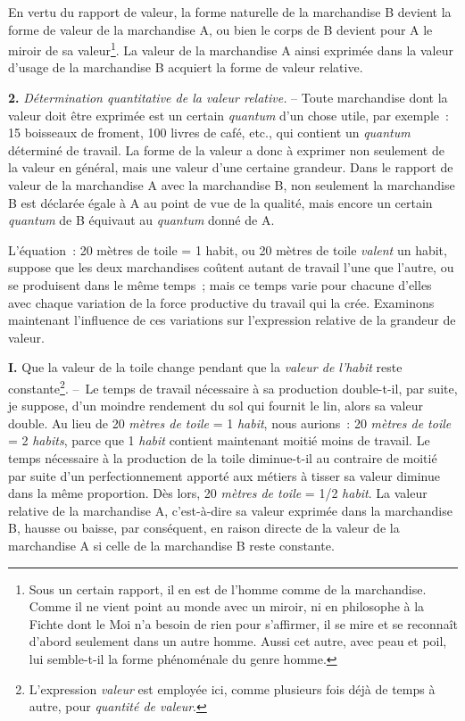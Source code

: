 \documentclass[french,twoside]{book} %
\begin{document}
En vertu du rapport de valeur, la forme naturelle de la marchandise B devient la forme de valeur de la marchandise A, ou bien le corps de B devient pour A le miroir de sa valeur\footnote{Sous un certain rapport, il en est de l’homme comme de la marchandise. Comme il ne vient point au monde avec un miroir, ni en philosophe à la Fichte dont le Moi n’a besoin de rien pour s’affirmer, il se mire et se reconnaît d’abord seulement dans un autre homme. Aussi cet autre, avec peau et poil, lui semble-t-il la forme phénoménale du genre homme.}. La valeur de la marchandise A ainsi exprimée dans la valeur d’usage de la marchandise B acquiert la forme de valeur relative.\par
\textbf{2.} \emph{Détermination quantitative de la valeur relative.} – Toute marchandise dont la valeur doit être exprimée est un certain \emph{quantum} d’un chose utile, par exemple : 15 boisseaux de froment, 100 livres de café, etc., qui contient un \emph{quantum} déterminé de travail. La forme de la valeur a donc à exprimer non seulement de la valeur en général, mais une valeur d’une certaine grandeur. Dans le rapport de valeur de la marchandise A avec la marchandise B, non seulement la marchandise B est déclarée égale à A au point de vue de la qualité, mais encore un certain \emph{quantum} de B équivaut au \emph{quantum} donné de A.\par
L’équation : 20 mètres de toile = 1 habit, ou 20 mètres de toile \emph{valent} un habit, suppose que les deux marchandises coûtent autant de travail l’une que l’autre, ou se produisent dans le même temps ; mais ce temps varie pour chacune d’elles avec chaque variation de la force productive du travail qui la crée. Examinons maintenant l’influence de ces variations sur l’expression relative de la grandeur de valeur.\par
\textbf{I.} Que la valeur de la toile change pendant que la \emph{valeur de l’habit} reste constante\footnote{L’expression \emph{valeur} est employée ici, comme plusieurs fois déjà de temps à autre, pour \emph{quantité de valeur}.}. – Le temps de travail nécessaire à sa production double-t-il, par suite, je suppose, d’un moindre rendement du sol qui fournit le lin, alors sa valeur double. Au lieu de 20 \emph{mètres de toile} = 1 \emph{habit}, nous aurions : 20 \emph{mètres de toile} = 2 \emph{habits}, parce que 1 \emph{habit} contient maintenant moitié moins de travail. Le temps nécessaire à la production de la toile diminue-t-il au contraire de moitié par suite d’un perfectionnement apporté aux métiers à tisser sa valeur diminue dans la même proportion. Dès lors, 20 \emph{mètres de toile} = 1/2 \emph{habit}. La valeur relative de la marchandise A, c’est-à-dire sa valeur exprimée dans la marchandise B, hausse ou baisse, par conséquent, en raison directe de la valeur de la marchandise A si celle de la marchandise B reste constante.\par
\end{document}
